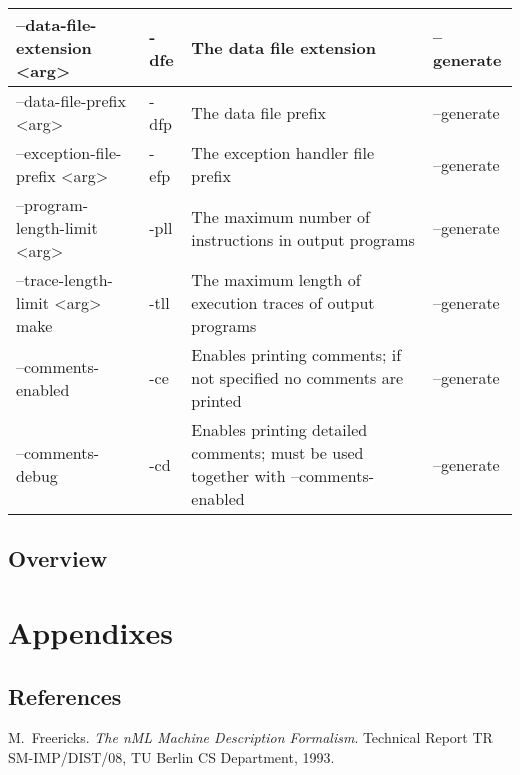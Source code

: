 \documentclass[oneside,final,14pt]{extreport}
\begin{document}
\begin{tabular}{ | p{4cm} | p{1cm} | p{5cm} | p{3cm} |}
  --data-file-extension <arg> & -dfe & The data file extension & --generate \\ \hline
  --data-file-prefix <arg> & -dfp & The data file prefix & --generate \\ \hline
  --exception-file-prefix <arg> & -efp & The exception handler file prefix & --generate \\ \hline
  --program-length-limit <arg> & -pll & The maximum number of instructions in output programs & --generate \\ \hline
  --trace-length-limit <arg> make& -tll & The maximum length of execution traces of output programs & --generate \\ \hline
  --comments-enabled & -ce & Enables printing comments; if not specified no comments are printed & --generate \\ \hline
  --comments-debug & -cd & Enables printing detailed comments; must be used together with --comments-enabled  & --generate \\ \hline
\end{tabular}


\section{Overview}


\chapter{Appendixes}

\section{References}



\begin{thebibliography}{1}

M.~Freericks.
\emph{The nML Machine Description Formalism}.
Technical Report TR SM-IMP/DIST/08, TU Berlin CS Department, 1993.

\end{thebibliography}
\end{document}
